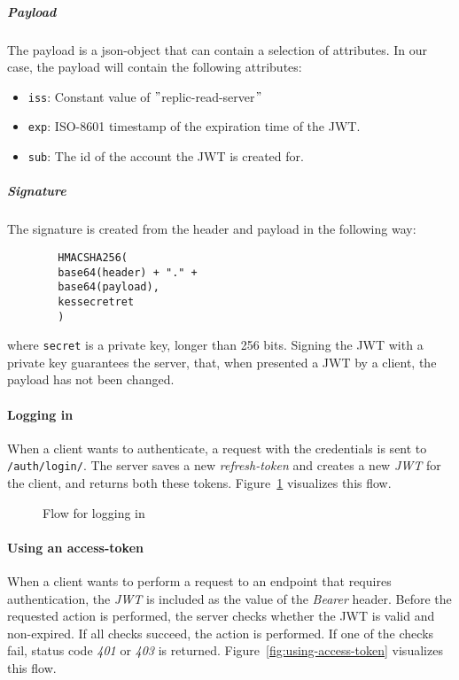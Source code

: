\subparagraph{Payload}
The payload is a json-object that can contain a selection of attributes.
In our case, the payload will contain the following attributes:
\begin{itemize}
    \item \texttt{iss}: Constant value of \("\)replic-read-server\("\)
    \item \texttt{exp}: ISO-8601 timestamp of the expiration time of the JWT\@.
    \item \texttt{sub}: The id of the account the JWT is created for.
\end{itemize}

\subparagraph{Signature}
The signature is created from the header and payload in the following way: \newline
\begin{center}
    \begin{verbatim}
        HMACSHA256(
        base64(header) + "." +
        base64(payload),
        kessecretret
        )
    \end{verbatim}
\end{center}
where \texttt{secret} is a private key, longer than 256 bits. \newline
Signing the JWT with a private key guarantees the server, that, when presented a JWT by a client, the payload has not been changed.

\paragraph{Logging in}
When a client wants to authenticate, a request with the credentials is sent to \texttt{/auth/login/}.
The server saves a new \textit{refresh-token} and creates a new \textit{JWT} for the client, and returns both these tokens. \newline
Figure~\ref{fig:logging-in} visualizes this flow.

\begin{figure}
    \centering

    \caption{Flow for logging in}
    \label{fig:logging-in}
\end{figure}

\paragraph{Using an access-token}
When a client wants to perform a request to an endpoint that requires authentication, the \textit{JWT} is included as the value of the \textit{Bearer} header.
Before the requested action is performed, the server checks whether the JWT is valid and non-expired.
If all checks succeed, the action is performed.
If one of the checks fail, status code \textit{401} or \textit{403} is returned. \newline
Figure~\ref{fig:using-access-token} visualizes this flow.

